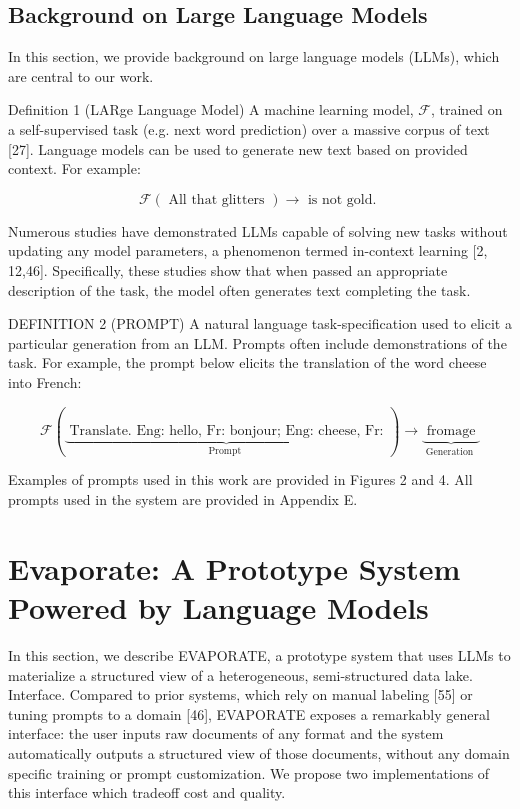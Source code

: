 \documentclass[10pt]{article}
\begin{document}
\subsection{Background on Large Language Models}
In this section, we provide background on large language models (LLMs), which are central to our work.

Definition 1 (LARge Language Model) A machine learning model, $\mathcal{F}$, trained on a self-supervised task (e.g. next word prediction) over a massive corpus of text [27]. Language models can be used to generate new text based on provided context. For example:

$$
\mathcal{F}(\text { All that glitters }) \rightarrow \text { is not gold. }
$$

Numerous studies have demonstrated LLMs capable of solving new tasks without updating any model parameters, a phenomenon termed in-context learning [2, 12,46]. Specifically, these studies show that when passed an appropriate description of the task, the model often generates text completing the task.

DEFINITION 2 (PROMPT) A natural language task-specification used to elicit a particular generation from an LLM. Prompts often include demonstrations of the task. For example, the prompt below elicits the translation of the word cheese into French:

$$
\mathcal{F}(\underbrace{\text { Translate. Eng: hello, Fr: bonjour; Eng: cheese, Fr: }}_{\text {Prompt }}) \rightarrow \underbrace{\text { fromage }}_{\text {Generation }}
$$

Examples of prompts used in this work are provided in Figures 2 and 4. All prompts used in the system are provided in Appendix E.

\section{Evaporate: A Prototype System Powered by Language Models}
In this section, we describe EVAPORATE, a prototype system that uses LLMs to materialize a structured view of a heterogeneous, semi-structured data lake. Interface. Compared to prior systems, which rely on manual labeling [55] or tuning prompts to a domain [46], EVAPORATE exposes a remarkably general interface: the user inputs raw documents of any format and the system automatically outputs a structured view of those documents, without any domain specific training or prompt customization. We propose two implementations of this interface which tradeoff cost and quality.
\end{document}

